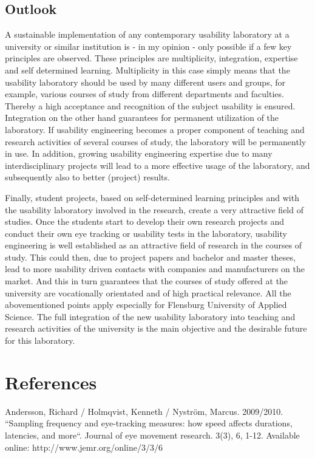 \documentclass[output=paper]{langsci/langscibook}
\begin{document}
\subsection{Outlook }

A sustainable implementation of any contemporary usability laboratory at a university or similar institution is - in my opinion - only possible if a few key principles are observed. These principles are multiplicity, integration, expertise and self determined learning. Multiplicity in this case simply means that the usability laboratory should be used by many different users and groups, for example, various courses of study from different departments and faculties. Thereby a high acceptance and recognition of the subject usability is ensured. Integration on the other hand guarantees for permanent utilization of the laboratory. If usability engineering becomes a proper component of teaching and research activities of several courses of study, the laboratory will be permanently in use. In addition, growing usability engineering expertise due to many interdisciplinary projects will lead to a more effective usage of the laboratory, and subsequently also to better (project) results.


Finally, student projects, based on self-determined learning principles and with the usability laboratory involved in the research, create a very attractive field of studies. Once the students start to develop their own research projects and conduct their own eye tracking or usability tests in the laboratory, usability engineering is well established as an attractive field of research in the courses of study. This could then, due to project papers and bachelor and master theses, lead to more {\textquotedbl}usability driven{\textquotedbl} contacts with companies and manufacturers on the market. And this in turn guarantees that the courses of study offered at the university are vocationally orientated and of high practical relevance. All the abovementioned points apply especially for Flensburg University of Applied Science. The full integration of the new usability laboratory into teaching and research activities of the university is the main objective and the desirable future for this laboratory.


\section{References}


Andersson, Richard / Holmqvist, Kenneth / Nyström, Marcus. 2009/2010. “Sampling frequency and eye-tracking measures: how speed affects durations, latencies, and more“. Journal of eye movement research. 3(3), 6, 1-12. Available online: http://www.jemr.org/online/3/3/6
\end{document}
